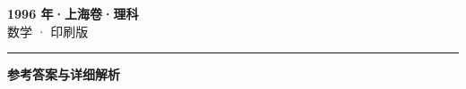 \documentclass[zihao=5, a4paper]{ctexart}
\begin{document}
\begin{center}
  {\Large\bfseries 1996 年·上海卷·理科}\\[4pt]
  {\large 数学 · 印刷版}
\end{center}
\medskip
{}

\par\bigskip\hrule\bigskip
{}
\begin{center}{\large\bfseries 参考答案与详细解析}\end{center}
\smallskip

\end{document}
